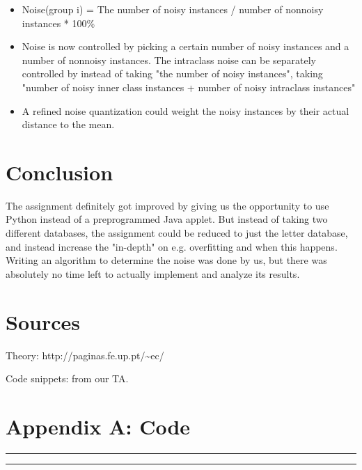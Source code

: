 \documentclass[	DIV=calc,%
				paper=a4,%
				fontsize=11pt,%
				twocolumn]{scrartcl}	 %
\newcommand{\HorRule}{\color{brsublue}%
					 \rule{\linewidth}{1pt}%
					 \color{black}
					 }
\begin{document}
\begin{itemize}
	\item Noise(group i) = The number of noisy instances / number of nonnoisy instances * 100\% 
	\item Noise is now controlled by picking a certain number of noisy instances and a number of nonnoisy instances. The intraclass noise can be separately controlled by instead of taking "the number of noisy instances", taking "number of noisy inner class instances + number of noisy intraclass instances"
	\item A refined noise quantization could weight the noisy instances by their actual distance to the mean.
\end{itemize}
	 
\vfill

\section*{Conclusion}

The assignment definitely got improved by giving us the opportunity to use Python instead of a preprogrammed Java applet. But instead of taking two different databases, the assignment could be reduced to just the letter database, and instead increase the "in-depth" on e.g. overfitting and when this happens. Writing an algorithm to determine the noise was done by us, but there was absolutely no time left to actually implement and analyze its results. 

\section*{Sources}

Theory: http://paginas.fe.up.pt/\textasciitilde ec/

Code snippets: from our TA. 

\newpage

\onecolumn
\section*{Appendix A: Code}

\HorRule



\HorRule


				
\end{document}

